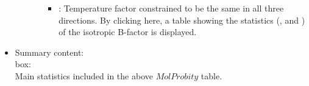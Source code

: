 \begin{itemize}
\begin{itemize}
\begin{itemize}
          \begin{itemize}
           \item {}: Temperature factor constrained to be the same in all three directions. By clicking here, a table showing the statistics (,  and ) of the isotropic B-factor is displayed.
          \end{itemize}
        \end{itemize}
    \end{itemize}
    
 \item Summary content:\\
 
   box:\\Main statistics included in the above $MolProbity$  table.

\end{itemize}
